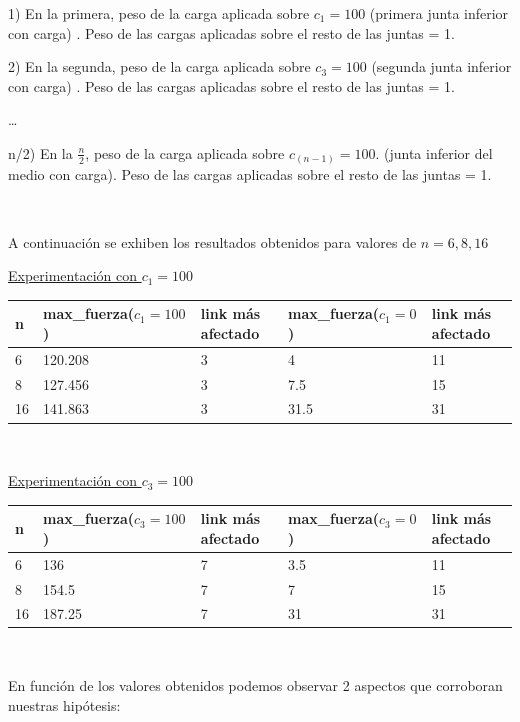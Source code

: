 1) En la primera, peso de la carga aplicada sobre $c_{1}=100$ (primera junta inferior con carga)
. Peso de las cargas aplicadas sobre el resto de las juntas = 1.

2) En la segunda, peso de la carga aplicada sobre $c_{3}=100$ (segunda junta inferior con carga)
. Peso de las cargas aplicadas sobre el resto de las juntas = 1.

\ldots

n/2) En la $\frac{n}{2}$, peso de la carga aplicada sobre $c_{(n-1)}=100$. (junta inferior del medio con carga).
Peso de las cargas aplicadas sobre el resto de las juntas = 1.

~

A continuación se exhiben los resultados obtenidos para valores de $n=6,8,16$

\underline{Experimentación con $c_{1} = 100$}

\begin{center}
    \small{
    \begin{tabular}{| l | l | l | l | l | }
    \hline
    n & max\_fuerza($c_{1}=100$) & link más afectado & max\_fuerza($c_{1}=0$) & link más afectado\\ \hline 
    6 & 120.208 & 3 & 4 & 11 \\ \hline
    8 & 127.456 & 3 & 7.5 & 15 \\ \hline
    16 & 141.863 & 3 & 31.5 & 31 \\ \hline
    \end{tabular}
    }
\end{center}

~

\underline{Experimentación con $c_{3} = 100$}

\begin{center}
    \small{
    \begin{tabular}{| l | l | l | l | l | }
    \hline
    n & max\_fuerza($c_{3}=100$) & link más afectado & max\_fuerza($c_{3}=0$) & link más afectado\\ \hline 
    6 & 136 & 7 & 3.5 & 11 \\ \hline
    8 & 154.5 & 7 & 7 & 15 \\ \hline
    16 & 187.25 & 7 & 31 & 31 \\ \hline
    \end{tabular}
    }
\end{center}

~

En función de los valores obtenidos podemos observar 2 aspectos que corroboran nuestras hipótesis:

